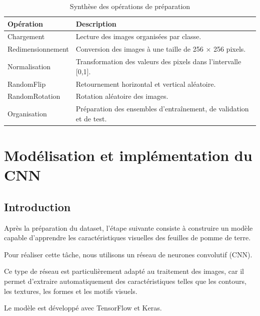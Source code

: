 \documentclass[12pt,a4paper,oneside]{report}
\begin{document}
\begin{table}[H]
\centering
\caption{Synthèse des opérations de préparation}
\begin{tabularx}{\textwidth}{p{3cm}X}
\toprule
\textbf{Opération} & \textbf{Description}\\
\midrule
Chargement &
Lecture des images organisées par classe.\\

Redimensionnement &
Conversion des images à une taille de 256 $\times$ 256 pixels.\\

Normalisation &
Transformation des valeurs des pixels dans l'intervalle [0,1].\\

RandomFlip &
Retournement horizontal et vertical aléatoire.\\

RandomRotation &
Rotation aléatoire des images.\\

Organisation &
Préparation des ensembles d'entraînement, de validation
et de test.\\
\bottomrule
\end{tabularx}
\end{table}


\chapter{Modélisation et implémentation du CNN}

\section{Introduction}

Après la préparation du dataset, l'étape suivante consiste
à construire un modèle capable d'apprendre les caractéristiques
visuelles des feuilles de pomme de terre.

Pour réaliser cette tâche, nous utilisons un réseau
de neurones convolutif (CNN).

Ce type de réseau est particulièrement adapté au traitement
des images, car il permet d'extraire automatiquement
des caractéristiques telles que les contours, les textures,
les formes et les motifs visuels.

Le modèle est développé avec TensorFlow et Keras.
\end{document}
